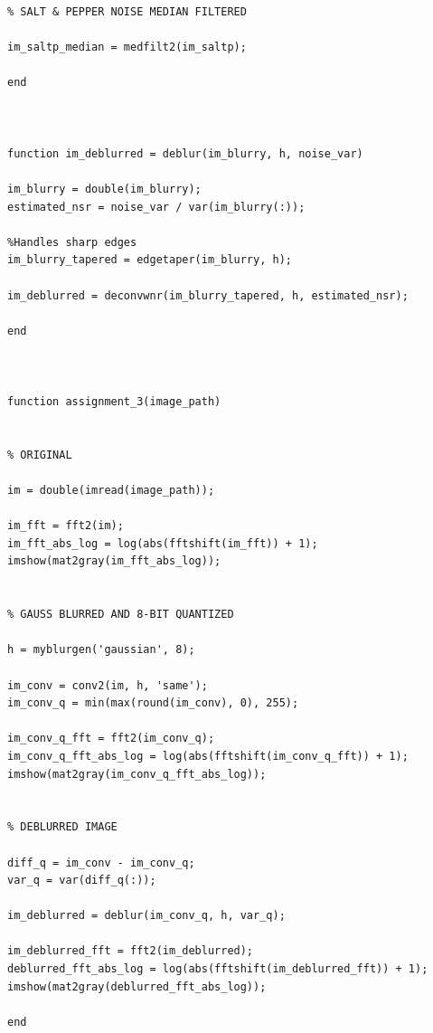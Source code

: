 \documentclass[a4paper]{article}
\begin{document}
\begin{verbatim}
% SALT & PEPPER NOISE MEDIAN FILTERED

im_saltp_median = medfilt2(im_saltp);

end



function im_deblurred = deblur(im_blurry, h, noise_var)

im_blurry = double(im_blurry);
estimated_nsr = noise_var / var(im_blurry(:));

%Handles sharp edges
im_blurry_tapered = edgetaper(im_blurry, h);

im_deblurred = deconvwnr(im_blurry_tapered, h, estimated_nsr);

end



function assignment_3(image_path)


% ORIGINAL

im = double(imread(image_path));

im_fft = fft2(im);
im_fft_abs_log = log(abs(fftshift(im_fft)) + 1);
imshow(mat2gray(im_fft_abs_log));


% GAUSS BLURRED AND 8-BIT QUANTIZED

h = myblurgen('gaussian', 8);

im_conv = conv2(im, h, 'same');
im_conv_q = min(max(round(im_conv), 0), 255);

im_conv_q_fft = fft2(im_conv_q);
im_conv_q_fft_abs_log = log(abs(fftshift(im_conv_q_fft)) + 1);
imshow(mat2gray(im_conv_q_fft_abs_log));


% DEBLURRED IMAGE

diff_q = im_conv - im_conv_q;
var_q = var(diff_q(:));

im_deblurred = deblur(im_conv_q, h, var_q);

im_deblurred_fft = fft2(im_deblurred);
deblurred_fft_abs_log = log(abs(fftshift(im_deblurred_fft)) + 1);
imshow(mat2gray(deblurred_fft_abs_log));

end

\end{verbatim}
\end{document}
